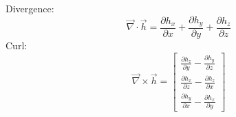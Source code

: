 \documentclass[a4paper, reqno, 12pt, openbib]{article} %
\begin{document}
\newline
Divergence: 
\begin{equation}
	\vec{\nabla} \cdot \vec{h} = \frac{\partial h_{x}}{\partial x} + \frac{\partial h_{y}}{\partial y} + \frac{\partial h_{z}}{\partial z}
\end{equation}
Curl: 
\begin{equation}
\vec{\nabla} \times \vec{h} = 
	\begin{bmatrix} 
		\frac{\partial h_{z}}{\partial y} - \frac{\partial h_{y}}{\partial z}\\
		\frac{\partial h_{x}}{\partial z} - \frac{\partial h_{z}}{\partial x}\\
		\frac{\partial h_{y}}{\partial x} - \frac{\partial h_{x}}{\partial y}
	\end{bmatrix}
\end{equation}
\end{document}
